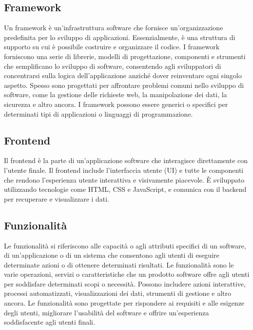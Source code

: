 \subsection*{Framework} 
Un framework è un'infrastruttura software che fornisce un'organizzazione predefinita per lo sviluppo di applicazioni. Essenzialmente, è una struttura di supporto su cui è possibile costruire e organizzare il codice. I framework forniscono una serie di librerie, modelli di progettazione, componenti e strumenti che semplificano lo sviluppo di software, consentendo agli sviluppatori di concentrarsi sulla logica dell'applicazione anziché dover reinventare ogni singolo aspetto. Spesso sono progettati per affrontare problemi comuni nello sviluppo di software, come la gestione delle richieste web, la manipolazione dei dati, la sicurezza e altro ancora. I framework possono essere generici o specifici per determinati tipi di applicazioni o linguaggi di programmazione.
\subsection*{Frontend} 
Il frontend è la parte di un'applicazione software che interagisce direttamente con l'utente finale. Il frontend include l'interfaccia utente (UI) e tutte le componenti che rendono l'esperienza utente interattiva e visivamente piacevole. È sviluppato utilizzando tecnologie come HTML, CSS e JavaScript, e comunica con il backend per recuperare e visualizzare i dati.
\subsection*{Funzionalità} 
Le funzionalità si riferiscono alle capacità o agli attributi specifici di un software, di un'applicazione o di un sistema che consentono agli utenti di eseguire determinate azioni o di ottenere determinati risultati. Le funzionalità sono le varie operazioni, servizi o caratteristiche che un prodotto software offre agli utenti per soddisfare determinati scopi o necessità. Possono includere azioni interattive, processi automatizzati, visualizzazioni dei dati, strumenti di gestione e altro ancora. Le funzionalità sono progettate per rispondere ai requisiti e alle esigenze degli utenti, migliorare l'usabilità del software e offrire un'esperienza soddisfacente agli utenti finali.
